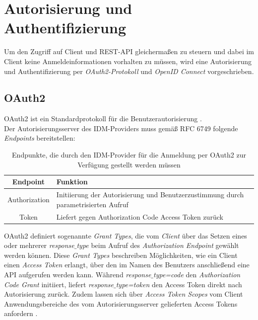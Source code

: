 \chapter{Autorisierung und Authentifizierung}

Um den Zugriff auf Client und REST-API gleichermaßen zu steuern und dabei im Client keine Anmeldeinformationen vorhalten zu müssen, wird eine Autorisierung und Authentifizierung per \textit{OAuth2-Protokoll} und \textit{OpenID Connect} vorgeschrieben.

\section{OAuth2}
\label{auth:oauth2}

OAuth2 ist ein Standardprotokoll für die Benutzerautorisierung \cite{rfc6749}. \\ 

Der Autorisierungsserver des IDM-Providers muss gemäß RFC 6749 folgende \textit{Endpoints} bereitstellen:

\begin{table}[htb]
    \begin{tabularx}{\textwidth}{|c|X|}
        \hline
\textbf{Endpoint} & \textbf{Funktion} \\ \hline
Authorization & Initiierung der Autorisierung und Benutzerzustimmung durch parametrisierten Aufruf \\ \hline
Token & Liefert gegen Authorization Code Access Token zurück \\ \hline
    \end{tabularx}

        \caption{Endpunkte, die durch den IDM-Provider für die Anmeldung per OAuth2 zur Verfügung gestellt werden müssen}
        \label{tab:auth:endpoints}
\end{table}

OAuth2 definiert sogenannte \textit{Grant Types}, die vom \textit{Client} über das Setzen eines oder mehrerer \textit{response$\_$type} beim Aufruf des \textit{Authorization Endpoint} gewählt werden können. 
Diese \textit{Grant Types} beschreiben Möglichkeiten, wie ein Client einen \textit{Access Token} erlangt, über den im Namen des Benutzers anschließend eine API aufgerufen werden kann. 
Während \textit{response$\_$type=code} den \textit{Authorization Code Grant} initiiert, liefert \textit{response$\_$type=token} den Access Token direkt nach Autorisierung zurück. 
Zudem lassen sich über \textit{Access Token Scopes} vom Client Anwendungsbereiche des vom Autorisierungsserver gelieferten Access Tokens anfordern \cite[Abschnitt~3.3]{rfc6749}. \\

